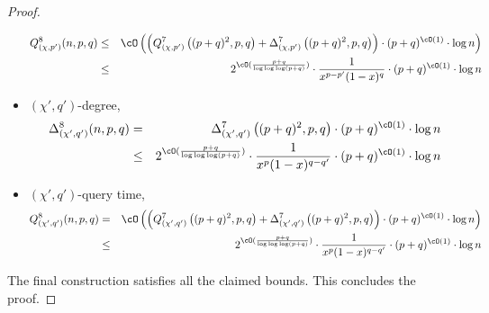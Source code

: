 \begin{proof}
\begin{itemize}
\begin{eqnarray*}
Q_{(\chi,p')}^8(n,p,q) &\leq& \cO\left(\left(Q_{(\chi,p')}^7\left((p+q)^2,p,q\right) + \Delta_{(\chi,p')}^7\left((p+q)^2,p,q\right) \right) \cdot (p+q)^{\cO(1)} \cdot \log n\right)\\
&\leq & 2^{\cO(\frac{p+q}{\log\log\log(p+q)})}\cdot \frac{1}{x^{p-p'}(1-x)^q}\cdot (p+q)^{\cO(1)} \cdot \log n
\end{eqnarray*}
\item $(\chi',q')$-degree, 
\begin{eqnarray*}
\Delta_{(\chi',q')}^8(n,p,q)&=&\Delta_{(\chi',q')}^7\left((p+q)^2,p,q\right) \cdot  (p+q)^{\cO(1)} \cdot \log n\\
&\leq & 2^{\cO(\frac{p+q}{\log\log\log(p+q)})}\cdot \frac{1}{x^{p}(1-x)^{q-q'}}\cdot (p+q)^{\cO(1)} \cdot \log n
\end{eqnarray*}
\item $(\chi',q')$-query time, 
\begin{eqnarray*}
Q_{(\chi',q')}^8(n,p,q)&=&\cO\left(\left(Q_{(\chi',q')}^7\left((p+q)^2,p,q\right) + \Delta_{(\chi',q')}^7\left((p+q)^2,p,q\right) \right) \cdot (p+q)^{\cO(1)} \cdot \log n\right)\\
&\leq & 2^{\cO(\frac{p+q}{\log\log\log(p+q)})}\cdot \frac{1}{x^{p}(1-x)^{q-q'}}\cdot (p+q)^{\cO(1)} \cdot \log n
\end{eqnarray*}
\end{itemize}
The final construction satisfies all the claimed bounds. This concludes the proof. 
\end{proof}
